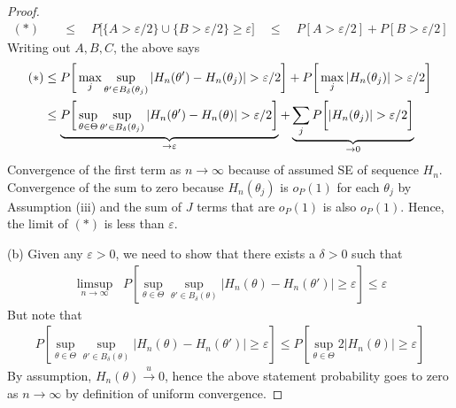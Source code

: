 \documentclass[12pt]{article}
\theoremstyle{plain}
\theoremstyle{definition}
\theoremstyle{remark}
\newcommand{\ra}{\rightarrow}
\newcommand{\uto}{\xrightarrow{u}}
\begin{document}
\begin{proof}
\begin{align*}
  (*)
  \quad
  &\leq
  \quad
  P\big[
    \{A> \varepsilon/2\}
    \cup \{B>\varepsilon/2\}
    \geq\varepsilon
  \big]
  \quad
  \leq
  \quad
  P[A>\varepsilon/2]
  +
  P[B>\varepsilon/2]
\end{align*}
Writing out $A,B,C$, the above says
\begin{align*}
  (*)
  &\leq
  P\bigg[
    \max_j
    \sup_{\theta'\in B_\delta(\theta_j)}
    |H_n(\theta')-H_n(\theta_j)|
    >\varepsilon/2
  \bigg]
  +
  P\bigg[
    \max_j
    |H_n(\theta_j)|
    >\varepsilon/2
  \bigg]
  \\
  &\leq
  \underbrace{%
    P\bigg[
      \sup_{\theta\in \Theta}
      \sup_{\theta'\in B_\delta(\theta_j)}
      |H_n(\theta')-H_n(\theta)|
      >\varepsilon/2
    \bigg]
  }_{\ra\varepsilon}
  +
  \underbrace{%
    \sum_j
    P\bigg[
      |H_n(\theta_j)|
      >\varepsilon/2
    \bigg]
  }_{\ra0}
\end{align*}
Convergence of the first term as $n\ra\infty$ because of assumed SE of
sequence $H_n$. Convergence of the sum to zero because $H_n(\theta_j)$
is $o_P(1)$ for each $\theta_j$ by Assumption (iii) and the sum of $J$
terms that are $o_P(1)$ is also $o_P(1)$.
Hence, the limit of $(*)$ is less than $\varepsilon$.

(b)
Given any $\varepsilon>0$, we need to show that there exists a
$\delta>0$ such that
\begin{align*}
  \limsup_{n\ra\infty}\;\;
  P\left[
    \sup_{\theta\in\Theta}
    \sup_{\theta'\in B_\delta(\theta)}
    |H_n(\theta)-H_n(\theta')|
    \geq
    \varepsilon
  \right]
  \leq \varepsilon
\end{align*}
But note that
\begin{align*}
  P\left[
    \sup_{\theta\in\Theta}
    \sup_{\theta'\in B_\delta(\theta)}
    |H_n(\theta)-H_n(\theta')|
    \geq
    \varepsilon
  \right]
  \leq
  P\left[
    \sup_{\theta\in\Theta}
    2|H_n(\theta)|
    \geq
    \varepsilon
  \right]
\end{align*}
By assumption, $H_n(\theta)\uto 0$, hence the above statement
probability goes to zero as $n\ra\infty$ by definition of uniform
convergence.
\end{proof}
\end{document}
